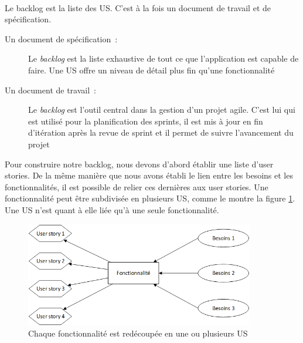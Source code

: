 			\paragraph{}%
			Le backlog est la liste des US. C'est à la fois un document de
			travail et de spécification.
			\begin{description}
				\item[Un document de spécification~:] Le \textit{backlog} est la liste
				exhaustive de tout ce que l'application est capable de faire. Une US offre un
				niveau de détail plus fin qu'une fonctionnalité
				\item[Un document de travail~:] Le \textit{backlog} est l'outil central dans
				la gestion d'un projet agile. C'est lui qui est utilisé pour la planification
				des sprints, il est mis à jour en fin d'itération après la revue de sprint
				et il permet de suivre l'avancement du projet
			\end{description}
			Pour construire notre backlog, nous devons d'abord établir une liste d'user
			stories.
			De la même manière que nous avons établi le lien entre les besoins et
			les fonctionnalités, il est possible de relier ces dernières aux user
			stories.
			Une fonctionnalité peut être subdivisée en plusieurs US, comme le
			montre la figure \ref{mapping_fonctios_us}. Une US n'est quant à elle
			liée qu'à une seule fonctionnalité.
			\begin{figure}[H]%
				\centering
				\includegraphics[width=10cm]{../img/part3/mapping_fonctios_us.png}
				\caption{\label{mapping_fonctios_us} Chaque fonctionnalité est redécoupée
				en une ou plusieurs US}
			\end{figure}
			

